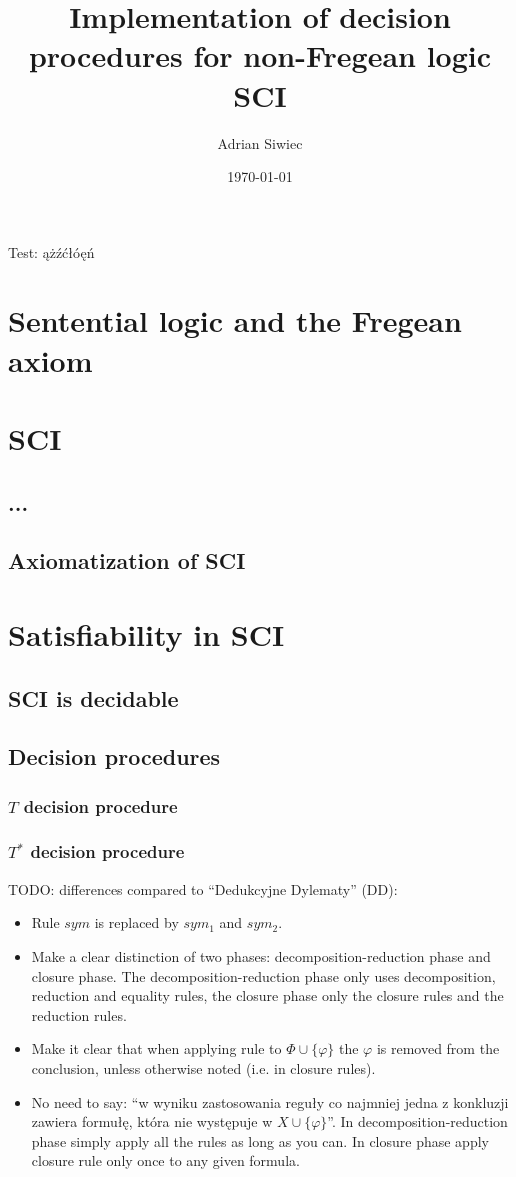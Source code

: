 \documentclass{article}
\title{Implementation of decision procedures for non-Fregean logic SCI}
\author{Adrian Siwiec}
\theoremstyle{definition}
\newcommand*{\Ts}{T^*}
\begin{document}
\date{\today}

\maketitle

Test: ążźćłóęń

\section{Sentential logic and the Fregean axiom}
\section{SCI}
\subsection{...}
\subsection{Axiomatization of SCI}
\section{Satisfiability in SCI}
\subsection{SCI is decidable}
\subsection{Decision procedures}
\subsubsection{$T$ decision procedure}
\subsubsection{$\Ts$ decision procedure}
TODO: differences compared to \enquote{Dedukcyjne Dylematy} (DD):
\begin{itemize}
    \item Rule $sym$ is replaced by $sym_1$ and $sym_2$.
    \item Make a clear distinction of two phases: decomposition-reduction phase and closure phase. The decomposition-reduction phase only uses decomposition, reduction and equality rules, the closure phase only the closure rules and the reduction rules.
    \item Make it clear that when applying rule to $\Phi \cup \{\varphi\}$ the $\varphi$ is removed from the conclusion, unless otherwise noted (i.e. in closure rules).
    \item No need to say: \enquote{w wyniku zastosowania reguły co najmniej jedna z konkluzji zawiera formułę,
    która nie występuje w $X \cup \{\varphi\}$}. In decomposition-reduction phase simply apply all the rules as long as you can. In closure phase apply closure rule only once to any given formula.
\end{itemize}
\end{document}
